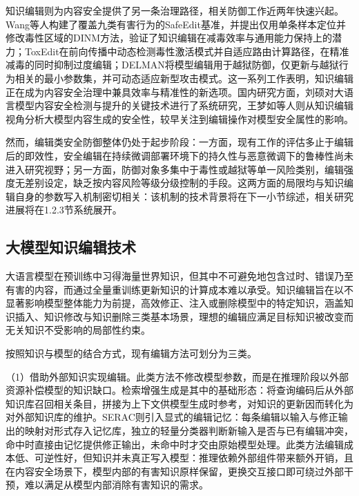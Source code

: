 知识编辑则为内容安全提供了另一条治理路径，相关防御工作近两年快速兴起。Wang等人\cite{wang2024safeedit}构建了覆盖九类有害行为的SafeEdit基准，并提出仅用单条样本定位并修改毒性区域的DINM方法，验证了知识编辑在减毒效率与通用能力保持上的潜力；ToxEdit\cite{lu2025toxedit}在前向传播中动态检测毒性激活模式并自适应路由计算路径，在精准减毒的同时抑制过度编辑；DELMAN\cite{wang2025delman}将模型编辑用于越狱防御，仅更新与越狱行为相关的最小参数集，并可动态适应新型攻击模式。这一系列工作表明，知识编辑正在成为内容安全治理中兼具效率与精准性的新选项。国内研究方面，刘硕\cite{liushuo2026}对大语言模型内容安全检测与提升的关键技术进行了系统研究，王梦如等人\cite{wangmengru2024}则从知识编辑视角分析大模型内容生成的安全性，较早关注到编辑操作对模型安全属性的影响。

然而，编辑类安全防御整体仍处于起步阶段：一方面，现有工作的评估多止于编辑后的即效性，安全编辑在持续微调部署环境下的持久性与恶意微调下的鲁棒性尚未进入研究视野；另一方面，防御对象多集中于毒性或越狱等单一风险类别，编辑强度无差别设定，缺乏按内容风险等级分级控制的手段。这两方面的局限均与知识编辑自身的参数写入机制密切相关：该机制的技术背景将在下一小节综述，相关研究进展将在1.2.3节系统展开。

\subsection{大模型知识编辑技术}

大语言模型在预训练中习得海量世界知识，但其中不可避免地包含过时、错误乃至有害的内容，而通过全量重训练更新知识的计算成本难以承受。知识编辑旨在以不显著影响模型整体能力为前提，高效修正、注入或删除模型中的特定知识\cite{zhang2024comprehensive,wang2024survey}，涵盖知识插入、知识修改与知识删除三类基本场景，理想的编辑应满足目标知识被改变而无关知识不受影响的局部性约束。

按照知识与模型的结合方式，现有编辑方法可划分为三类\cite{zhang2024comprehensive}。

（1）借助外部知识实现编辑。此类方法不修改模型参数，而是在推理阶段以外部资源补偿模型的知识缺口。检索增强生成\cite{lewis2020rag}是其中的基础形态：将查询编码后从外部知识库召回相关条目，拼接为上下文供模型生成时参考，对知识的更新因而转化为对外部知识库的维护。SERAC\cite{mitchell2022serac}则引入显式的编辑记忆：每条编辑以输入与修正输出的映射对形式存入记忆库，独立的轻量分类器判断新输入是否与已有编辑冲突，命中时直接由记忆提供修正输出，未命中时才交由原始模型处理。此类方法编辑成本低、可逆性好，但知识并未真正写入模型：推理依赖外部组件带来额外开销，且在内容安全场景下，模型内部的有害知识原样保留，更换交互接口即可绕过外部干预，难以满足从模型内部消除有害知识的需求。

